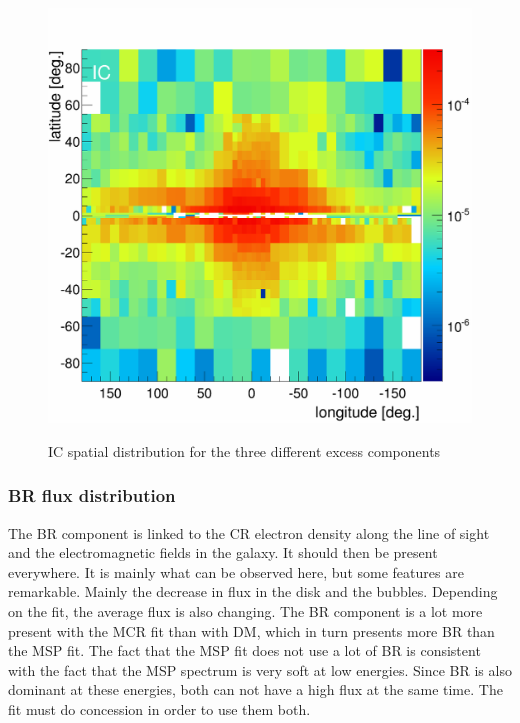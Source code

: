 \begin{figure}[h]
\begin{minipage}[h]{0.3\textwidth}
	  \label{}
  \end{minipage}
  \hfill
  \begin{minipage}[h]{0.3\textwidth}
	  \centering
	  \includegraphics[width=1.\linewidth]{pic/discussion/MSPonly_IC_integral_flux.png}
	  \label{}
  \end{minipage}
  \caption{IC spatial distribution for the three different excess components}
  \label{fig:IC_flux_distrib_excess_comp}	 
\end{figure}


\subsubsection{BR flux distribution}
The BR component is linked to the CR electron density along the line of sight and the electromagnetic fields in the galaxy. It should then be present everywhere. It is mainly what can be observed here, but some features are remarkable. Mainly the decrease in flux in the disk and the bubbles.
Depending on the fit, the average flux is also changing. The BR component is a lot more present with the MCR fit than with DM, which in turn presents more BR than the MSP fit. The fact that the MSP fit does not use a lot of BR is consistent with the fact that the MSP spectrum is very soft at low energies. Since BR is also dominant at these energies, both can not have a high flux at the same time. The fit must do concession in order to use them both.

